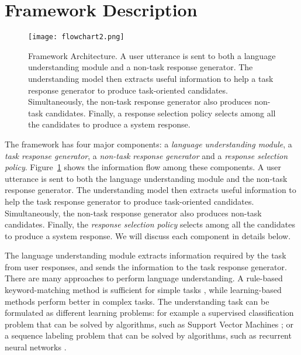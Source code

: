 \documentclass[11pt]{article}
\newcommand{\dk}[1]{{\color{red} #1}}
\begin{document}
\section{Framework Description}
\begin{figure}
\centering
\texttt{[image: flowchart2.png]}
\caption{Framework Architecture. \small{A user utterance is sent to both a language understanding module and a non-task response generator. The understanding model then extracts useful information to help a task response generator to produce task-oriented candidates. Simultaneously, the non-task response generator also produces non-task candidates. Finally, a response selection policy selects among all the candidates to produce a system response.} } %
\label{fig:flow}       
\end{figure}
The framework has four major components: a \textit{language understanding module}, a \textit{task response generator}, a \textit{non-task response generator} and a \textit{response selection policy}. Figure~\ref{fig:flow} shows the information flow among these components. A user utterance is sent to both the language understanding module and the non-task response generator. The understanding model then extracts useful information to help the task response generator to produce task-oriented candidates. Simultaneously, the non-task response generator also produces non-task candidates. Finally, the \textit{response selection policy} selects among all the candidates to produce a system response. We will discuss each component in details below. %

The language understanding module extracts information required by the task from user responses, and sends the information to the task response generator. There are many approaches to perform language understanding. A rule-based keyword-matching method is sufficient for simple tasks \cite{he1998language}, while learning-based methods perform better in complex tasks. The understanding task can be formulated as different learning problems: for example a supervised classification problem that can be solved by algorithms, such as Support Vector Machines \cite{williams2015fast}; or a sequence labeling problem that can be solved by algorithms, such as recurrent neural networks \cite{mesnil2013investigation}. 
\end{document}
